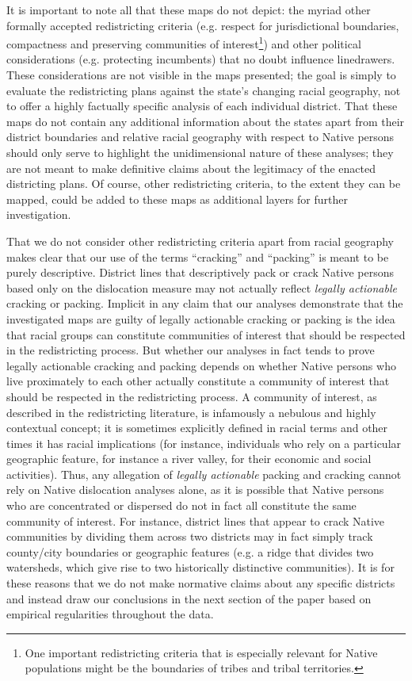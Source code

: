 \documentclass[12pt]{article}
\begin{document}
It is important to note all that these maps do not depict: the myriad other formally accepted redistricting criteria (e.g. respect for jurisdictional boundaries, compactness and preserving communities of interest\footnote{One important redistricting criteria that is especially relevant for Native populations might be the boundaries of tribes and tribal territories.}) and other political considerations (e.g. protecting incumbents) that no doubt influence linedrawers. These considerations are not visible in the maps presented; the goal is simply to evaluate the redistricting plans against the state's changing racial geography, not to offer a highly factually specific analysis of each individual district. That these maps do not contain any additional information about the states apart from their district boundaries and relative racial geography with respect to Native persons should only serve to highlight the unidimensional nature of these analyses; they are not meant to make definitive claims about the legitimacy of the enacted districting plans. Of course, other redistricting criteria, to the extent they can be mapped, could be added to these maps as additional layers for further investigation.

That we do not consider other redistricting criteria apart from racial geography makes clear that our use of the terms ``cracking'' and ``packing'' is meant to be purely descriptive.  District lines that descriptively pack or crack Native persons based only on the dislocation measure may not actually reflect \textit{legally actionable} cracking or packing. Implicit in any claim that our analyses demonstrate that the investigated maps are guilty of legally actionable cracking or packing is the idea that racial groups can constitute communities of interest that should be respected in the redistricting process.  But whether our analyses in fact tends to prove legally actionable cracking and packing depends on whether Native persons who live proximately to each other actually constitute a community of interest that should be respected in the redistricting process. A community of interest, as described in the redistricting literature, is infamously a nebulous and highly contextual concept; it is sometimes explicitly defined in racial terms and other times it has racial implications (for instance, individuals who rely on a particular geographic feature, for instance a river valley, for their economic and social activities). Thus, any allegation of \textit{legally actionable} packing and cracking cannot rely on Native dislocation analyses alone, as it is possible that Native persons who are concentrated or dispersed do not in fact all constitute the same community of interest. For instance, district lines that appear to crack Native communities by dividing them across two districts may in fact simply track county/city boundaries or geographic features (e.g. a ridge that divides two watersheds, which give rise to two historically distinctive communities). It is for these reasons that we do not make normative claims about any specific districts and instead draw our conclusions in the next section of the paper based on empirical regularities throughout the data.
\end{document}
